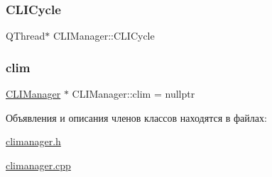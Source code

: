 \subsubsection{\texorpdfstring{C\+L\+I\+Cycle}{CLICycle}}
{\footnotesize\ttfamily Q\+Thread$\ast$ C\+L\+I\+Manager\+::\+C\+L\+I\+Cycle}

\mbox{\label{class_c_l_i_manager_a9f8d1e3fca086f03d5ee5ea6d89287ab}} 
\subsubsection{\texorpdfstring{clim}{clim}}
{\footnotesize\ttfamily \hyperlink{class_c_l_i_manager}{C\+L\+I\+Manager} $\ast$ C\+L\+I\+Manager\+::clim = nullptr\hspace{0.3cm}{\ttfamily [static]}}



Объявления и описания членов классов находятся в файлах\+:\begin{DoxyCompactItemize}
\item 
\hyperlink{climanager_8h}{climanager.\+h}\item 
\hyperlink{climanager_8cpp}{climanager.\+cpp}\end{DoxyCompactItemize}
